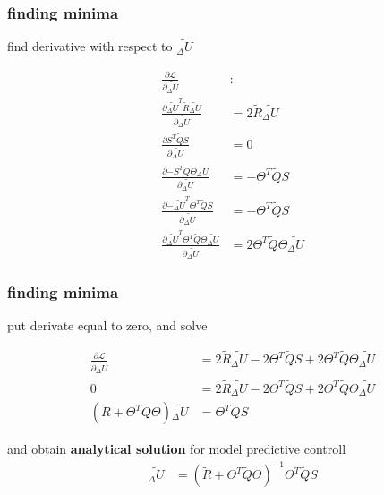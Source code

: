 \documentclass{beamer}
\begin{document}
\begin{frame}
  
  \frametitle{\bf finding minima}

  find derivative with respect to $\tilde{_\Delta U}$ 

  \begin{align*}  
    \frac{\partial \mathcal{L}}{\partial {\tilde{_\Delta U}}} & : \\
    \frac{\partial {\tilde{_\Delta U}^T \tilde{R} \tilde{_\Delta U} } }{\partial {\tilde{_\Delta U}}} & = 2\tilde{R}\tilde{_\Delta U} \\
    \frac{\partial {S^T\tilde{Q}S}}{\partial {\tilde{_\Delta U}}} & = 0 \\
    \frac{\partial {- S^T \tilde{Q} \Theta \tilde{_\Delta U} }}{\partial {\tilde{_\Delta U}}} & = -\Theta^T\tilde{Q}S \\
    \frac{\partial {- \tilde{_\Delta U}^T \Theta^T\tilde{Q}S}}{\partial {\tilde{_\Delta U}}} & = -\Theta^T\tilde{Q}S \\
    \frac{\partial { \tilde{_\Delta U}^T\Theta^T\tilde{Q}\Theta\tilde{_\Delta U}}}{\partial {\tilde{_\Delta U}}} & = 2\Theta^T\tilde{Q}\Theta\tilde{_\Delta U}
  \end{align*}  

\end{frame}


\begin{frame}
  
  \frametitle{\bf finding minima}

  put derivate equal to zero, and solve

  \begin{align*}
    \frac{\partial \mathcal{L}}{\partial {\tilde{_\Delta U}}} & = 2 \tilde{R} \tilde{_\Delta U} - 2\Theta^T\tilde{Q}S + 2\Theta^T\tilde{Q}\Theta\tilde{_\Delta U} \\
    0 &= 2 \tilde{R} \tilde{_\Delta U} - 2\Theta^T\tilde{Q}S + 2\Theta^T\tilde{Q}\Theta\tilde{_\Delta U} \\
    (\tilde{R} + \Theta^T\tilde{Q}\Theta)\tilde{_\Delta U}  &= \Theta^T\tilde{Q}S 
  \end{align*}  

  and obtain {\bf \color{red} analytical solution} for model predictive controll
  \begin{align*}
    \tilde{_\Delta U} &= (\tilde{R} + \Theta^T\tilde{Q}\Theta)^{-1} \Theta^T\tilde{Q}S
  \end{align*} 

\end{frame}
\end{document}
